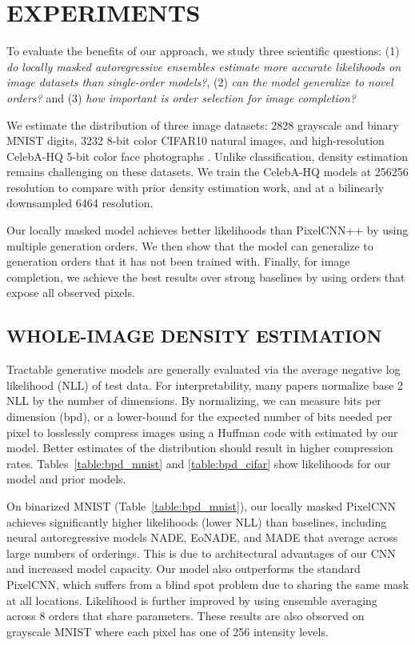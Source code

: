 \documentclass[letterpaper]{article}
\begin{document}
\section{EXPERIMENTS}

To evaluate the benefits of our approach, we study three scientific questions: (1) \textit{do locally masked autoregressive ensembles estimate more accurate likelihoods on image datasets than single-order models?}, (2) \textit{can the model generalize to novel orders?} and (3) \textit{how important is order selection for image completion?}

We estimate the distribution of three image datasets: 2828 grayscale and binary \citep{salakhutdinov2008quantitative} MNIST digits, 3232 8-bit color CIFAR10 natural images, and high-resolution CelebA-HQ 5-bit color face photographs \citep{karras2018progressive}. Unlike classification, density estimation remains challenging on these datasets. We train the CelebA-HQ models at 256256 resolution to compare with prior density estimation work, and at a bilinearly downsampled 6464 resolution.

Our locally masked model achieves better likelihoods than PixelCNN++ by using multiple generation orders. We then show that the model can generalize to generation orders that it has not been trained with. Finally, for image completion, we achieve the best results over strong baselines by using orders that expose all observed pixels.

\subsection{WHOLE-IMAGE DENSITY ESTIMATION}

Tractable generative models are generally evaluated via the average negative log likelihood (NLL) of test data. For interpretability, many papers normalize base 2 NLL by the number of dimensions. By normalizing, we can measure bits per dimension (bpd), or a lower-bound for the expected number of bits needed per pixel to losslessly compress images using a Huffman code with  estimated by our model. Better estimates of the distribution should result in higher compression rates. Tables~\ref{table:bpd_mnist} and \ref{table:bpd_cifar} show likelihoods for our model and prior models.

On binarized MNIST (Table~\ref{table:bpd_mnist}), our locally masked PixelCNN achieves significantly higher likelihoods (lower NLL) than baselines, including neural autoregressive models NADE, EoNADE, and MADE that average across large numbers of orderings. This is due to architectural advantages of our CNN and increased model capacity. Our model also outperforms the standard PixelCNN, which suffers from a blind spot problem due to sharing the same mask at all locations. Likelihood is further improved by using ensemble averaging across 8 orders that share parameters. These results are also observed on grayscale MNIST where each pixel has one of 256 intensity levels.
\end{document}
